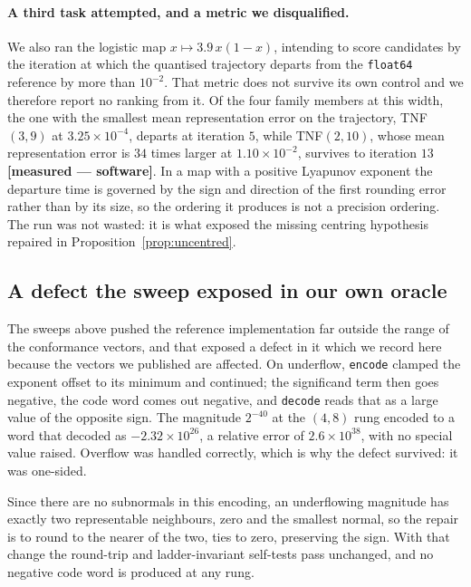 \documentclass[11pt]{article}
\theoremstyle{definition}
\begin{document}
\paragraph{A third task attempted, and a metric we disqualified.} We also ran the
logistic map $x \mapsto 3.9\,x(1-x)$, intending to score candidates by the
iteration at which the quantised trajectory departs from the \texttt{float64}
reference by more than $10^{-2}$. That metric does not survive its own control and
we therefore report no ranking from it. Of the four family members at this width,
the one with the smallest mean representation error on the trajectory, TNF$(3,9)$
at $3.25\times10^{-4}$, departs at iteration $5$, while TNF$(2,10)$, whose mean
representation error is $34$ times larger at $1.10\times10^{-2}$, survives to
iteration $13$ \textbf{[measured --- software]}. In a map with a positive Lyapunov
exponent the departure time is governed by the sign and direction of the first
rounding error rather than by its size, so the ordering it produces is not a
precision ordering. The run was not wasted: it is what exposed the missing
centring hypothesis repaired in Proposition~\ref{prop:uncentred}.

\subsection{A defect the sweep exposed in our own oracle}
\label{sec:oracledefect}

The sweeps above pushed the reference implementation far outside the range of the
conformance vectors, and that exposed a defect in it which we record here because
the vectors we published are affected. On underflow, \texttt{encode} clamped the
exponent offset to its minimum and continued; the significand term then goes
negative, the code word comes out negative, and \texttt{decode} reads that as a
large value of the opposite sign. The magnitude $2^{-40}$ at the $(4,8)$ rung
encoded to a word that decoded as $-2.32\times 10^{26}$, a relative error of
$2.6\times 10^{38}$, with no special value raised. Overflow was handled correctly,
which is why the defect survived: it was one-sided.

Since there are no subnormals in this encoding, an underflowing magnitude has
exactly two representable neighbours, zero and the smallest normal, so the repair
is to round to the nearer of the two, ties to zero, preserving the sign. With that
change the round-trip and ladder-invariant self-tests pass unchanged, and no
negative code word is produced at any rung.
\end{document}
